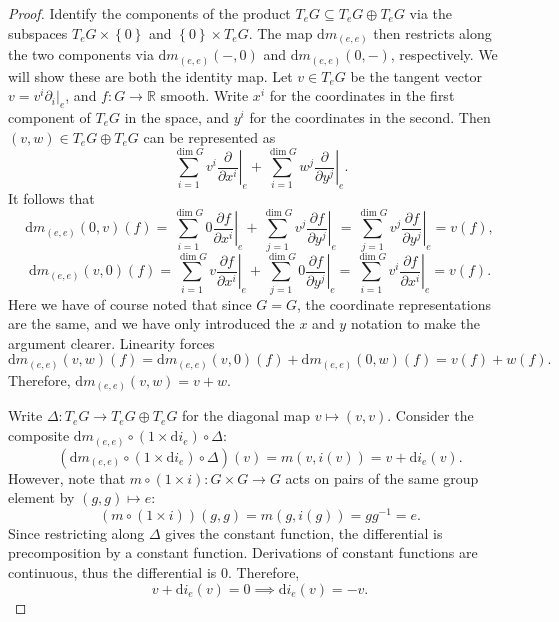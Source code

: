 \documentclass[11pt, letterpaper]{article}
\theoremstyle{plain}
\begin{document}
\begin{proof}
	Identify the components of the product $T_eG \subseteq T_eG \oplus T_eG$ via the subspaces $T_eG \times \left\{ 0 \right\} $ and $\left\{ 0 \right\} \times T_eG$. The map $\mathrm{d}m_{(e,e)} $ then restricts along the two components via $\mathrm{d}m_{(e,e)} (-,0)$ and $\mathrm{d}m_{(e,e)} (0,-)$, respectively. We will show these are both the identity map. Let $v\in T_eG$ be the tangent vector $v=v^i \partial _i|_e$, and $f : G \to \mathbb{R} $ smooth. Write $x^i$ for the coordinates in the first component of $T_eG$ in the space, and $y^i$ for the coordinates in the second. Then $(v,w)\in T_eG \oplus T_eG$ can be represented as
	\[
		\sum_{i=1}^{\dim G} v^i \left.\frac{\partial }{\partial x^i} \right|_e + \sum_{i=1}^{\dim G} w^j\left. \frac{\partial }{\partial y^j} \right|_e
	.\]
	It follows that
	\[
		\mathrm{d}m_{(e,e)} (0,v)(f)=\sum_{i=1}^{\dim G} 0 \left.\frac{\partial f}{\partial x^i} \right|_e + \sum_{j=1}^{\dim G} v^j \left. \frac{\partial f}{\partial y^j} \right|_e = \sum_{j=1}^{\dim G} v^j \left.\frac{\partial f}{\partial y^j} \right|_e = v(f)
	,\]
	\[
		\mathrm{d}m_{(e,e)} (v,0)(f)=\sum_{i=1}^{\dim G} v \left.\frac{\partial f}{\partial x^i} \right|_e + \sum_{j=1}^{\dim G} 0 \left. \frac{\partial f}{\partial y^j} \right|_e = \sum_{i=1}^{\dim G} v^i \left.\frac{\partial f}{\partial x^i} \right|_e = v(f)
	.\]
	Here we have of course noted that since $G=G$, the coordinate representations are the same, and we have only introduced the $x$ and $y$ notation to make the argument clearer. Linearity forces
	\[
		\mathrm{d}m_{(e,e)} (v,w)(f)=\mathrm{d}m_{(e,e)} (v,0)(f) + \mathrm{d}m_{(e,e)} (0,w)(f)=v(f)+w(f)
	.\]
	Therefore, $\mathrm{d} m_{(e,e)} (v,w)=v+w$.

	Write $\Delta : T_eG \to T_eG\oplus T_eG$ for the diagonal map $v\mapsto (v,v)$. Consider the composite $\mathrm{d}m_{(e,e)}  \circ (1\times \mathrm{d}i_e)\circ \Delta $:
	\[
		(\mathrm{d}m_{(e,e)} \circ (1\times \mathrm{d}i_e)\circ \Delta )(v)=m(v, i(v)) = v + \mathrm{d}i_e(v)
	.\]
	However, note that $m \circ (1\times i) : G\times G \to G$ acts on pairs of the same group element by $(g,g)\mapsto e$:
	\[
		(m\circ (1\times i))(g,g)=m(g,i(g))=g g^{-1} =e
	.\]
	Since restricting along $\Delta $ gives the constant function, the differential is precomposition by a constant function. Derivations of constant functions are continuous, thus the differential is 0. Therefore,
	\[
		v+\mathrm{d} i_e(v) = 0 \implies \mathrm{d} i_e(v)=-v
	.\]
\end{proof}
\end{document}
